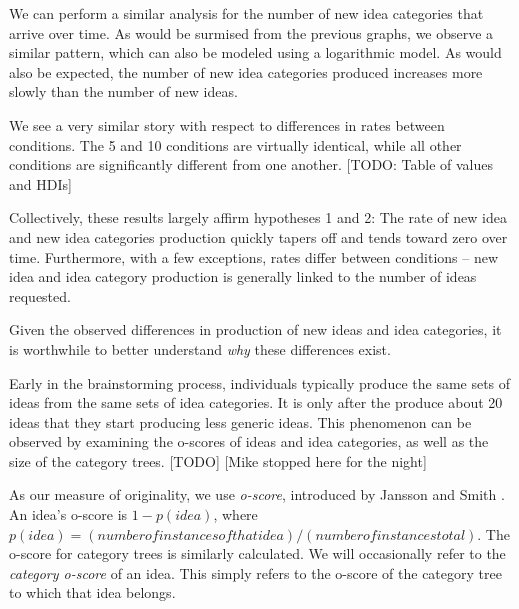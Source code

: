 We can perform a similar analysis for the number of new idea categories that arrive over time. As would be surmised from the previous graphs, we observe a similar pattern, which can also be modeled using a logarithmic model. As would also be expected, the number of new idea categories produced increases more slowly than the number of new ideas.

We see a very similar story with respect to differences in rates between conditions. The 5 and 10 conditions are virtually identical, while all other conditions are significantly different from one another. [TODO: Table of values and HDIs]

Collectively, these results largely affirm hypotheses 1 and 2: The rate of new idea and new idea categories production quickly tapers off and tends toward zero over time. Furthermore, with a few exceptions, rates differ between conditions -- new idea and idea category production is generally linked to the number of ideas requested.

Given the observed differences in production of new ideas and idea categories, it is worthwhile to better understand \emph{why} these differences exist. 


Early in the brainstorming process, individuals typically produce the same sets of ideas from the same sets of idea categories. It is only after the produce about 20 ideas that they start producing less generic ideas. This phenomenon can be observed by examining the o-scores of ideas and idea categories, as well as the size of the category trees. [TODO] [Mike stopped here for the night]

As our measure of originality, we use \emph{o-score}, introduced by Jansson and Smith \cite{jansson_design_1991}. An idea's o-score is $1 - p(idea)$, where $p(idea) = (number of instances of that idea)/(number of instances total)$. The o-score for category trees is similarly calculated. We will occasionally refer to the \emph{category o-score} of an idea. This simply refers to the o-score of the category tree to which that idea belongs.

